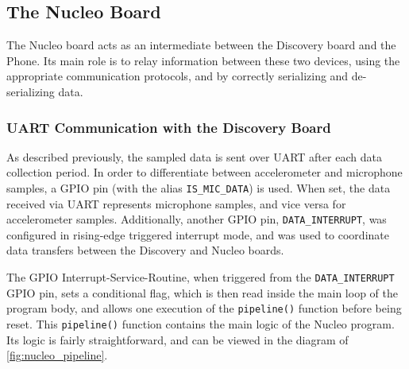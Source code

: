 \subsection{The Nucleo Board}


The Nucleo board acts as an intermediate between the Discovery board and the Phone. Its main role is to relay information between these two devices, using the appropriate communication protocols, and by correctly serializing and de-serializing data.

\subsubsection{UART Communication with the Discovery Board}
As described previously, the sampled data is sent over UART after each data collection period. In order to differentiate between accelerometer and microphone samples, a GPIO pin (with the alias \verb|IS_MIC_DATA|) is used. When set, the data received via UART represents microphone samples, and vice versa for accelerometer samples. Additionally, another GPIO pin, \verb|DATA_INTERRUPT|, was configured in rising-edge triggered interrupt mode, and was used to coordinate data transfers between the Discovery and Nucleo boards.

The GPIO Interrupt-Service-Routine, when triggered from the \verb|DATA_INTERRUPT| GPIO pin, sets a conditional flag, which is then read inside the main loop of the program body, and allows one execution of the \verb|pipeline()| function before being reset. This \verb|pipeline()| function contains the main logic of the Nucleo program. Its logic is fairly straightforward, and can be viewed in the diagram of \autoref{fig:nucleo_pipeline}.

